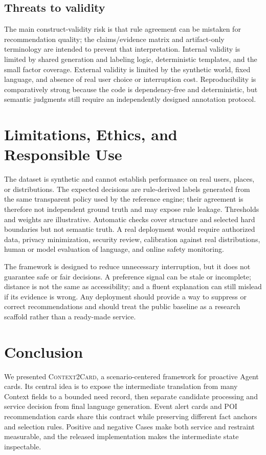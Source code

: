 \documentclass[10pt]{article}
\newcommand{\method}{\textsc{Context2Card}}
\begin{document}
\subsection{Threats to validity}

The main construct-validity risk is that rule agreement can be mistaken for recommendation quality; the claims/evidence matrix and artifact-only terminology are intended to prevent that interpretation. Internal validity is limited by shared generation and labeling logic, deterministic templates, and the small factor coverage. External validity is limited by the synthetic world, fixed language, and absence of real user choice or interruption cost. Reproducibility is comparatively strong because the code is dependency-free and deterministic, but semantic judgments still require an independently designed annotation protocol.

\section{Limitations, Ethics, and Responsible Use}

The dataset is synthetic and cannot establish performance on real users, places, or distributions. The expected decisions are rule-derived labels generated from the same transparent policy used by the reference engine; their agreement is therefore not independent ground truth and may expose rule leakage. Thresholds and weights are illustrative. Automatic checks cover structure and selected hard boundaries but not semantic truth. A real deployment would require authorized data, privacy minimization, security review, calibration against real distributions, human or model evaluation of language, and online safety monitoring.

The framework is designed to reduce unnecessary interruption, but it does not guarantee safe or fair decisions. A preference signal can be stale or incomplete; distance is not the same as accessibility; and a fluent explanation can still mislead if its evidence is wrong. Any deployment should provide a way to suppress or correct recommendations and should treat the public baseline as a research scaffold rather than a ready-made service.

\section{Conclusion}

We presented \method{}, a scenario-centered framework for proactive Agent cards. Its central idea is to expose the intermediate translation from many Context fields to a bounded need record, then separate candidate processing and service decision from final language generation. Event alert cards and POI recommendation cards share this contract while preserving different fact anchors and selection rules. Positive and negative Cases make both service and restraint measurable, and the released implementation makes the intermediate state inspectable.
\end{document}
